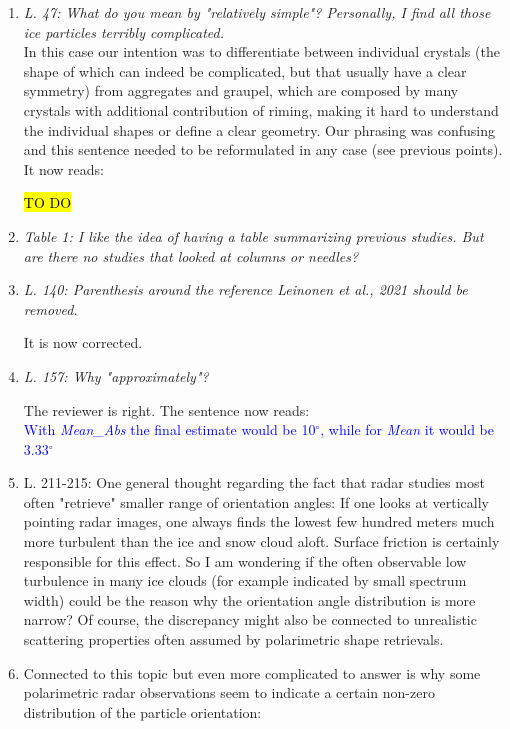 \documentclass[12pt]{article}
\newcommand*{\blue}{\textcolor{blue}}
\begin{document}
\begin{enumerate}
    \item \textit{L. 47: What do you mean by "relatively simple"? Personally, I find all those ice particles terribly complicated.}\\
    
    In this case our intention was to differentiate between individual crystals (the shape of which can indeed be complicated, but that usually have a clear symmetry) from aggregates and graupel, which are composed by many crystals with additional contribution of riming, making it hard to understand the individual shapes or define a clear geometry. Our phrasing was confusing and this sentence needed to be reformulated in any case (see previous points). It now reads:

     \hl{TO DO}
    
    \item \textit{Table 1: I like the idea of having a table summarizing previous studies. But are there no studies that looked at columns or needles?}\\

    \cite{Klett_JAS_1995, Reinking_JAMC_1997}



    \item \textit{L. 140: Parenthesis around the reference Leinonen et al., 2021 should be removed.}
    
    \noindent
    It is now corrected.\\

    \item \textit{L. 157: Why "approximately"?}

    \noindent
    The reviewer is right. The sentence now reads:\\
    \blue{With \textit{Mean\_Abs} the final estimate would be 10$^\circ$, while for \textit{Mean} it would be 3.33$^\circ$}\\


    \item L. 211-215: One general thought regarding the fact that radar studies most often "retrieve" smaller range of orientation angles: If one looks at vertically pointing radar images, one always finds the lowest few hundred meters much more turbulent than the ice and snow cloud aloft. Surface friction is certainly responsible for this effect. So I am wondering if the often observable low turbulence in many ice clouds (for example indicated by small spectrum width) could be the reason why the orientation angle distribution is more narrow? Of course, the discrepancy might also be connected to unrealistic scattering properties often assumed by polarimetric shape retrievals.

    \item Connected to this topic but even more complicated to answer is why some polarimetric radar observations seem to indicate a certain non-zero distribution of the particle orientation: \cite{Melnikov_JAOT_2013}
\end{enumerate}



\end{document}
